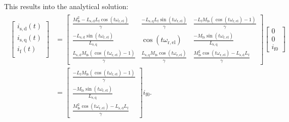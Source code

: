 \begin{solutionblock}
    This results into the analytical solution:
    \begin{align}
        \begin{split}
        \begin{bmatrix}
            i_{\mathrm{s,d}}(t) \\
            i_{\mathrm{s,q}}(t) \\
            i_{\mathrm{f}}(t) \\
        \end{bmatrix}
        &= 
        \begin{bmatrix}
            \frac{M_{\mathrm{fs}}^2 - L_{\mathrm{s,d}}L_{\mathrm{f}}\cos(t\omega_{\mathrm{r,el}})}{\gamma} & \frac{-L_{\mathrm{s,q}}L_{\mathrm{f}}\sin(t\omega_{\mathrm{r,el}})}{\gamma} & \frac{-L_{\mathrm{f}}M_{\mathrm{fs}}(\cos(t\omega_{\mathrm{r,el}})-1)}{\gamma} \\
            \frac{-L_{\mathrm{s,d}}\sin(t\omega_{\mathrm{r,el}})}{L_{\mathrm{s,q}}} & \cos(t\omega_{\mathrm{r,el}}) & \frac{-M_{\mathrm{fs}}\sin(t\omega_{\mathrm{r,el}})}{L_{\mathrm{s,q}}} \\
            \frac{L_{\mathrm{s,d}}M_{\mathrm{fs}}(\cos(t\omega_{\mathrm{r,el}})-1)}{\gamma} & \frac{L_{\mathrm{s,q}}M_{\mathrm{fs}}\cos(t\omega_{\mathrm{r,el}})}{\gamma} & \frac{M_{\mathrm{fs}}^2\cos(t\omega_{\mathrm{r,el}})-L_{\mathrm{s,d}}L_{\mathrm{f}}}{\gamma}
        \end{bmatrix}
        \begin{bmatrix}
            0 \\
            0 \\
            i_{\mathrm{f0}}
        \end{bmatrix} \\
        &=
        \begin{bmatrix}
            \frac{-L_{\mathrm{f}}M_{\mathrm{fs}}(\cos(t\omega_{\mathrm{r,el}})-1)}{\gamma} \\
            \frac{-M_{\mathrm{fs}}\sin(t\omega_{\mathrm{r,el}})}{L_{\mathrm{s,q}}} \\
            \frac{M_{\mathrm{fs}}^2 \cos(t\omega_{\mathrm{r,el}}) -L_{\mathrm{s,d}}L_{\mathrm{f}}}{\gamma}
        \end{bmatrix}
        i_{\mathrm{f0}}.
    \end{split}
    \end{align}

\end{solutionblock}






